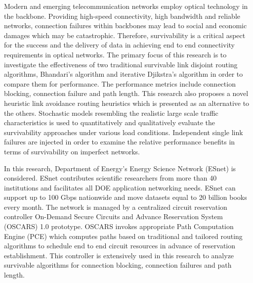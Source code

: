 

	Modern and emerging telecommunication networks employ optical technology in the backbone. Providing  high-speed connectivity, high bandwidth and reliable networks, connection failures within backbones may lead to social and economic damages which may be catastrophic. Therefore, survivability is a critical aspect for the success and the delivery of data in achieving end to end connectivity requirements in optical networks. The primary focus of this research is to investigate the effectiveness of two traditional survivable link disjoint routing algorithms, Bhandari's algorithm and iterative Djikstra's algorithm in order to compare them for performance. The performance metrics include connection blocking, connection failure and path length. This research also proposes a novel heuristic link avoidance routing heuristics which is presented as an alternative to the others. Stochastic models resembling the realistic large scale traffic characteristics is used to quantitatively and qualitatively evaluate the survivability approaches under various load conditions. Independent single link failures are injected in order to examine the relative performance benefits in terms of survivability on imperfect networks.

In this research, Department of Energy's Energy Science Network (ESnet) is considered. ESnet contributes scientific researchers from more than 40 institutions and facilitates all DOE application networking needs. ESnet can support up to 100 Gbps nationwide and move datasets equal to 20 billion books every month. The network is managed by a centralized circuit reservation controller On-Demand Secure Circuits and Advance Reservation System (OSCARS) 1.0 prototype. OSCARS invokes appropriate Path Computation Engine (PCE) which computes paths based on traditional and tailored routing algorithms to schedule end to end circuit resources in advance of reservation establishment. This controller is extensively used in this research to analyze survivable algorithms for connection blocking, connection failures and path length.